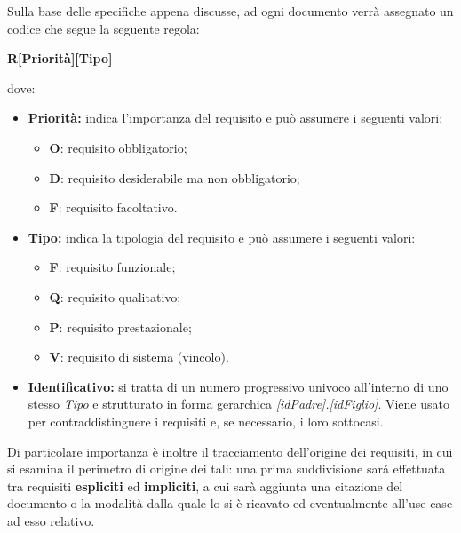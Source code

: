 Sulla base delle specifiche appena discusse, ad ogni documento verrà assegnato un codice che segue la seguente regola:
\begin{center}
    \textbf{R[Priorità][Tipo]\textunderscore[Identificativo]}
\end{center}
dove:
\begin{itemize}
    \item \textbf{Priorità:} indica l'importanza del requisito e può assumere i seguenti valori:
        \begin{itemize}
            \item \textbf{O}: requisito obbligatorio;
            \item \textbf{D}: requisito desiderabile ma non obbligatorio;
            \item \textbf{F}: requisito facoltativo.
        \end{itemize}                 
    \item \textbf{Tipo:} indica la tipologia del requisito e può assumere i seguenti valori:
        \begin{itemize}
            \item \textbf{F}: requisito funzionale;
            \item \textbf{Q}: requisito qualitativo;
            \item \textbf{P}: requisito prestazionale;
            \item \textbf{V}: requisito di sistema (vincolo).
        \end{itemize}             
    \item \textbf{Identificativo:} si tratta di un numero progressivo univoco all'interno di uno stesso \textit{Tipo} e strutturato in forma gerarchica \textit{[idPadre].[idFiglio]}. Viene usato per contraddistinguere i requisiti e, se necessario, i loro sottocasi.
\end{itemize}
Di particolare importanza è inoltre il tracciamento dell'origine dei requisiti, in cui si esamina il perimetro di origine dei tali: una prima suddivisione sará effettuata tra requisiti \textbf{espliciti} ed \textbf{impliciti}, a cui sarà aggiunta una citazione del documento o la modalità dalla quale lo si è ricavato ed eventualmente all'use case ad esso relativo.


